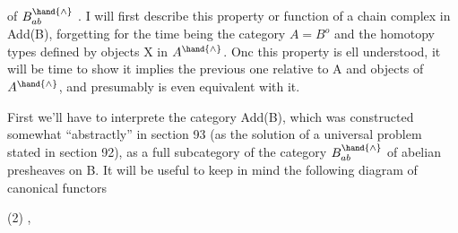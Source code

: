 
of $B^{\hand{\wedge}}_{ab}$ . I will first describe this property or  function of a chain
complex in Add(B), forgetting for the time being the category $A=B^{o}$
and the homotopy types defined by objects X in $A^{\hand{\wedge}}$. Onc this property
is ell understood, it will be time to show it implies the previous
one relative to A and objects of $A^{\hand{\wedge}}$, and presumably is even equivalent
with it.

First we'll have to interprete the category Add(B), which was
constructed somewhat ``abstractly'' in section 93 (as the solution of a
universal problem stated in section 92), as a full subcategory of
the category $B^{\hand{\wedge}}_{ab}$ of abelian presheaves on B. It will be useful to
keep in mind the following diagram of canonical functors

(2)  ,

